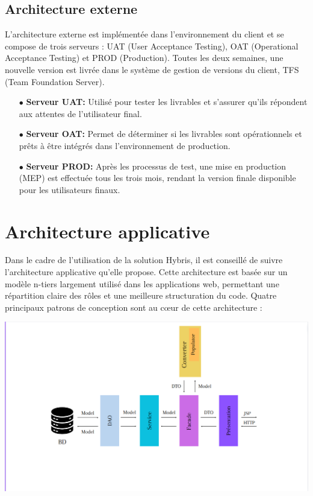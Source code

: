 \subsection{Architecture externe}

L'architecture externe est implémentée dans l'environnement du client et se compose de trois serveurs : UAT (User Acceptance Testing), OAT (Operational Acceptance Testing) et PROD (Production). Toutes les deux semaines, une nouvelle version est livrée dans le système de gestion de versions du client, TFS (Team Foundation Server).

\begin{itemize} \item [$\bullet$]\textbf{Serveur UAT:} Utilisé pour tester les livrables et s'assurer qu'ils répondent aux attentes de l'utilisateur final. \item [$\bullet$]\textbf{Serveur OAT:} Permet de déterminer si les livrables sont opérationnels et prêts à être intégrés dans l'environnement de production. \item [$\bullet$]\textbf{Serveur PROD:} Après les processus de test, une mise en production (MEP) est effectuée tous les trois mois, rendant la version finale disponible pour les utilisateurs finaux. \end{itemize}

\section{Architecture applicative}

Dans le cadre de l'utilisation de la solution Hybris, il est conseillé de suivre l'architecture applicative qu'elle propose. Cette architecture est basée sur un modèle n-tiers largement utilisé dans les applications web, permettant une répartition claire des rôles et une meilleure structuration du code. Quatre principaux patrons de conception sont au cœur de cette architecture :

\begin{center}
    \centering
    \includegraphics[width=19cm]{Figures/Dto.png}
    \label{fig:processus}
\end{center} 

